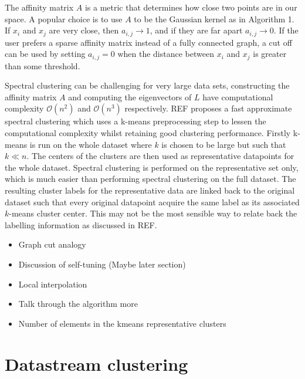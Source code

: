 \documentclass[a4document]{article}		%
\begin{document}
The affinity matrix $A$  is a metric that determines how close two points are in our space. A popular choice is to use $A$ to be the Gaussian kernel as in Algorithm 1. If $x_i$ and $x_j$ are very close, then $a_{i,j} \rightarrow 1 $, and if they are far apart $a_{i,j} \rightarrow 0$. If the user prefers a sparse affinity matrix instead of a fully connected graph, a cut off can be used by setting $a_{i,j} = 0$ when the distance between $x_i$ and $x_j$ is greater than some threshold. 

Spectral clustering can be challenging for very large data sets, constructing the affinity matrix $A$ and computing the eigenvectors of $L$ have computational complexity $\mathcal{O}(n^2)$ and $\mathcal{O}(n^3)$ respectively. REF proposes a fast approximate spectral clustering which uses a k-means preprocessing step to lessen the computational complexity whilst retaining good clustering performance. Firstly k-means is run on the whole dataset where $k$ is chosen to be large but such that $k \ll n$. The centers of the clusters are then used as representative datapoints for the whole dataset. Spectral clustering is performed on the representative set only, which is much easier than performing spectral clustering on the full dataset. The resulting cluster labels for the representative data are linked back to the original dataset such that every original datapoint acquire the same label as its associated $k$-means cluster center. This may not be the most sensible way to relate back the labelling information as discussed in REF. 

\begin{itemize}
\item Graph cut analogy
\item Discussion of self-tuning (Maybe later section)
\item Local interpolation
\item Talk through the algorithm more
\item Number of elements in the kmeans representative clusters
\end{itemize}

\section{Datastream clustering}
\end{document}
